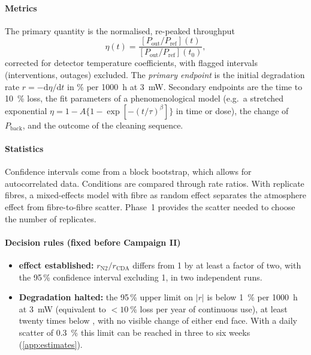 \paragraph{Metrics} The primary quantity is the normalised, re-peaked throughput
\begin{equation*}
  \eta(t)=\frac{[P_\text{out}/P_\text{ref}](t)}{[P_\text{out}/P_\text{ref}](t_0)},
\end{equation*}
corrected for detector temperature coefficients, with flagged intervals (interventions, outages) excluded. The \emph{primary
endpoint} is the initial degradation rate $r=-\mathrm{d}\eta/\mathrm{d}t$ in \si{\percent} per
\SI{1000}{h} at \SI{3}{mW}. Secondary endpoints are the time to \SI{10}{\percent} loss, the fit
parameters of a phenomenological model (e.g.\ a stretched exponential
$\eta=1-A\{1-\exp[-(t/\tau)^{\beta}]\}$ in time or dose), the change of $P_\text{back}$, and the outcome of
the cleaning sequence.

\paragraph{Statistics} Confidence intervals come from a block bootstrap, which allows for
autocorrelated data. Conditions are compared through rate ratios. With replicate fibres, a
mixed-effects model with fibre as random effect separates the atmosphere effect from fibre-to-fibre
scatter. Phase~1 provides the scatter needed to choose the number of replicates.

\paragraph{Decision rules (fixed before Campaign II)}
\begin{itemize}
  \item \textbf{\Oxy{} effect established:} $r_\text{N2}/r_\text{CDA}$ differs from 1 by at least a factor of
        two, with the 95\,\% confidence interval excluding 1, in two independent runs.
  \item \textbf{Degradation halted:} the 95\,\% upper limit on $|r|$ is below \SI{1}{\percent} per
        \SI{1000}{h} at \SI{3}{mW} (equivalent to $<\SI{10}{\percent}$ loss per year of continuous use),
        at least twenty times below , with no visible change of either end face. With a daily
        scatter of \SI{0.3}{\percent} this limit can be reached in three to six weeks (\cref{app:estimates}).
\end{itemize}

